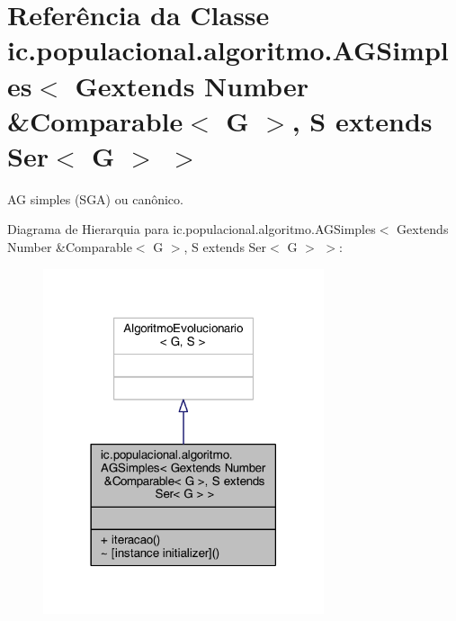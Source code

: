 \hypertarget{classic_1_1populacional_1_1algoritmo_1_1_a_g_simples_3_01_gextends_01_number_01_6_comparable_3_0be0ec9d5f7dd5a82100acb38215a761d}{\section{Referência da Classe ic.\-populacional.\-algoritmo.\-A\-G\-Simples$<$ Gextends Number \&Comparable$<$ G $>$, S extends Ser$<$ G $>$ $>$}
\label{classic_1_1populacional_1_1algoritmo_1_1_a_g_simples_3_01_gextends_01_number_01_6_comparable_3_0be0ec9d5f7dd5a82100acb38215a761d}
}


A\-G simples (S\-G\-A) ou canônico.  




Diagrama de Hierarquia para ic.\-populacional.\-algoritmo.\-A\-G\-Simples$<$ Gextends Number \&Comparable$<$ G $>$, S extends Ser$<$ G $>$ $>$\-:\nopagebreak
\begin{figure}[H]
\begin{center}
\leavevmode
\includegraphics[width=234pt]{classic_1_1populacional_1_1algoritmo_1_1_a_g_simples_3_01_gextends_01_number_01_6_comparable_3_0908c421faf32439f86928e74347a3f5e}
\end{center}
\end{figure}


